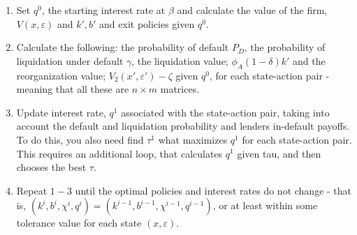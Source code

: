 \documentclass[12pt]{article}
\begin{document}
\begin{enumerate}
    \item Set $q^0$, the starting interest rate at $\beta$ and calculate the value of the firm, $V(x,\varepsilon)$ and $k', b'$ and exit policies given  $q^0$. 
    \item Calculate the following: the probability of default $P_D$, the probability of liquidation under default $\gamma$, the liquidation value; $\phi_A (1-\delta) k'$ and the reorganization value; $V_2 (x', \varepsilon') - \zeta$ given $q^0$, for each state-action pair - meaning that all these are $n \times m$ matrices.
    \item Update interest rate, $q^1$ associated with the state-action pair, taking into account the default and liquidation probability and lenders in-default payoffs. To do this, you also need find $\tau^1$ what maximizes $q^1$ for each state-action pair. This requires an additional loop, that calculates $q^1$ given tau, and then chooses the best $\tau$.
    \item Repeat $1-3$ until the optimal policies and interest rates do not change - that is, $ (k^{i},b^{i},\chi^{i},q^{i}) = (k^{i-1},b^{i-1},\chi^{i-1},q^{i-1}) $, or at least within some tolerance value for each state $(x,\varepsilon)$.
\end{enumerate}
\end{document}
